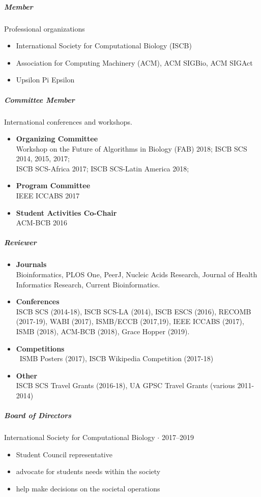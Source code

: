 \documentclass[10pt,letterpaper]{article}
\newcommand{\bigdot}{$\cdot$\xspace}
\begin{document}
\subparagraph{Member} Professional organizations
\begin{itemize}
\item International Society for Computational Biology (ISCB)
\item Association for Computing Machinery (ACM), ACM SIGBio, ACM SIGAct
\item Upsilon Pi Epsilon
\end{itemize}

\subparagraph{Committee Member} International conferences and workshops.
\begin{itemize}[leftmargin=!,labelindent=5pt,itemindent=-15pt]
    \item \textbf{Organizing Committee} \\
    Workshop on the Future of Algorithms in Biology (FAB) 2018; 
    ISCB SCS 2014, 2015, 2017;  \\
    ISCB SCS\nobreakdash-Africa 2017; 
    ISCB SCS-Latin America 2018;  
    \item \textbf{Program Committee} \\ IEEE ICCABS 2017
    \item \textbf{Student Activities Co-Chair} \\ ACM-BCB 2016
\end{itemize}

\subparagraph{Reviewer} 
\begin{itemize}[leftmargin=!,labelindent=5pt,itemindent=-15pt]
    \item \textbf{Journals} \\
        Bioinformatics, 
        PLOS One, 
        PeerJ, 
        Nucleic Acids Research, 
        Journal of Health Informatics Research,
        Current Bioinformatics.
    \item \textbf{Conferences} \\
        ISCB SCS (2014-18), %
        ISCB SCS-LA (2014), %
        ISCB ESCS (2016), %
	RECOMB (2017-19), %
	WABI (2017), %
	ISMB/ECCB (2017,19), %
    	IEEE ICCABS (2017), %
	ISMB (2018), %
	ACM-BCB (2018), %
	Grace Hopper (2019). %
     \item \textbf{Competitions} \\\
     	ISMB Posters (2017), 
     	ISCB Wikipedia Competition (2017-18)
     \item \textbf{Other} \\
         ISCB SCS Travel Grants (2016-18), 
         UA GPSC Travel Grants (various 2011-2014)
\end{itemize}
\newpage
\subparagraph{Board of Directors}
International Society for Computational Biology  \bigdot 2017--2019
\begin{itemize}
    \item Student Council representative 
    \item advocate for students needs within the society
    \item help make decisions on the societal operations
\end{itemize}
\end{document}
